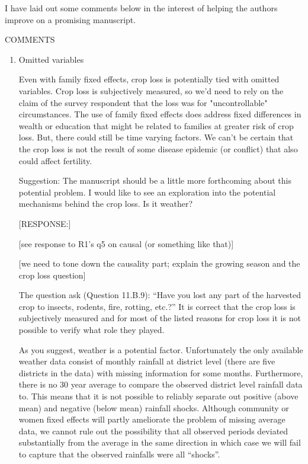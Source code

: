 \documentclass[letterpaper,12pt]{article}
\begin{document}
I have laid out some comments below in the interest of helping the
authors improve on a promising manuscript.


COMMENTS

\begin{enumerate}

\item Omitted variables

Even with family fixed effects, crop loss is potentially tied with
omitted variables. Crop loss is subjectively measured, so we'd need to
rely on the claim of the survey respondent that the loss was for
"uncontrollable" circumstances. The use of family fixed effects does
address fixed differences in wealth or education that might be related
to families at greater risk of crop loss. But, there could still be time
varying factors. We can't be certain that the crop loss is not the
result of some disease epidemic (or conflict) that also could affect
fertility.

Suggestion: The manuscript should be a little more forthcoming about
this potential problem. I would like to see an exploration into the
potential mechanisms behind the crop loss. Is it weather?

[RESPONSE:]

[see response to R1's q5 on causal (or something like that)]

[we need to tone down the causality part; explain the growing season and
the crop loss question]

The question ask (Question 11.B.9): ``Have you lost any part of the 
harvested crop to insects, rodents, fire, rotting, etc.?''
It is correct that the crop loss is subjectively measured and for
most of the listed reasons for crop loss it is not possible to verify 
what role they played.

As you suggest, weather is a potential factor.
Unfortunately the only available weather data consist of monthly rainfall 
at district level (there are five districts in the data) with missing 
information for some months.
Furthermore, there is no 30 year average to compare the observed 
district level rainfall data to.
This means that it is not possible to reliably separate out positive 
(above mean) and negative (below mean) rainfall shocks.
Although community or women fixed effects will partly ameliorate the
problem of missing average data, we cannot rule out the possibility
that all observed periods deviated substantially from the average in 
the same direction in which case we will fail to capture that the observed
rainfalls were all ``shocks''.


\end{enumerate}
\end{document}
